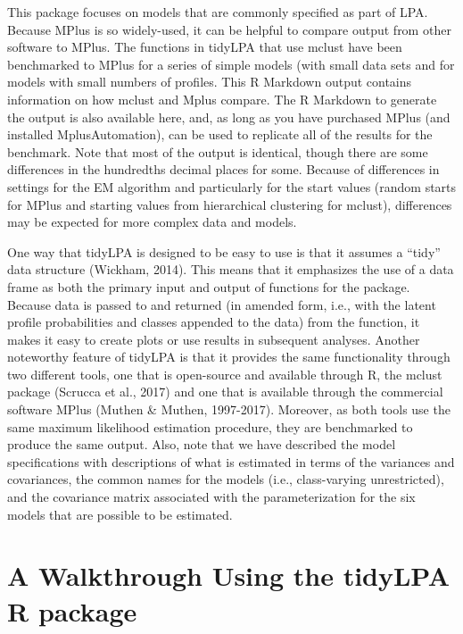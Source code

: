 \documentclass[english,man]{apa6}
\begin{document}
This package focuses on models that are commonly specified as part of LPA.
Because MPlus is so widely-used, it can be helpful to compare output from other
software to MPlus. The functions in tidyLPA that use mclust have been
benchmarked to MPlus for a series of simple models (with small data sets and for
models with small numbers of profiles. This R Markdown output contains
information on how mclust and Mplus compare. The R Markdown to generate the
output is also available here, and, as long as you have purchased MPlus (and
installed MplusAutomation), can be used to replicate all of the results for the
benchmark. Note that most of the output is identical, though there are some
differences in the hundredths decimal places for some. Because of differences in
settings for the EM algorithm and particularly for the start values (random
starts for MPlus and starting values from hierarchical clustering for mclust),
differences may be expected for more complex data and models.

One way that tidyLPA is designed to be easy to use is that it assumes a \enquote{tidy}
data structure (Wickham, 2014). This means that it emphasizes the use of a data
frame as both the primary input and output of functions for the package. Because
data is passed to and returned (in amended form, i.e., with the latent profile
probabilities and classes appended to the data) from the function, it makes it
easy to create plots or use results in subsequent analyses. Another noteworthy
feature of tidyLPA is that it provides the same functionality through two
different tools, one that is open-source and available through R, the mclust
package (Scrucca et al., 2017) and one that is available through the commercial
software MPlus (Muthen \& Muthen, 1997-2017). Moreover, as both tools use the
same maximum likelihood estimation procedure, they are benchmarked to produce
the same output. Also, note that we have described the model specifications with
descriptions of what is estimated in terms of the variances and covariances, the
common names for the models (i.e., class-varying unrestricted), and the
covariance matrix associated with the parameterization for the six models that
are possible to be estimated.

\hypertarget{a-walkthrough-using-the-tidylpa-r-package}{%
\section{A Walkthrough Using the tidyLPA R package}\label{a-walkthrough-using-the-tidylpa-r-package}}
\end{document}

